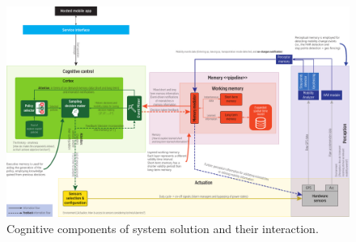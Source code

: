 \documentclass[ENG,PhD]{cinvestav}
\begin{document}
\begin{landscape}
\begin{figure}
  \centering
  \includegraphics[width=\linewidth]{vectors/smartness-components-v4}
  \caption{Cognitive components of system solution and their interaction.}
  \label{fig:smartness-components}
\end{figure}
\end{landscape}




 
%                                                                                                                                                             
\end{document}
